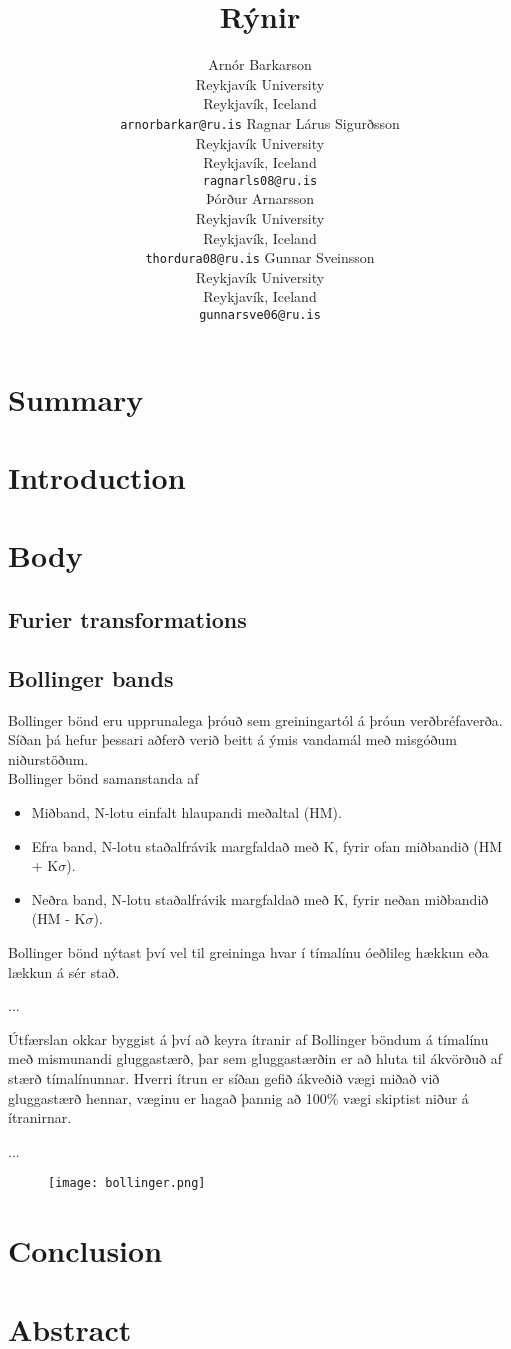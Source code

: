 \documentclass[11pt]{article}
\title{Rýnir}
\author{Arnór Barkarson\\
  Reykjavík University\\
  Reykjavík, Iceland\\
  {\tt arnorbarkar@ru.is}  \And  
  Ragnar Lárus Sigurðsson\\
  Reykjavík University\\
  Reykjavík, Iceland\\
  {\tt  ragnarls08@ru.is}\\ \And 
  Þórður Arnarsson\\
  Reykjavík University\\
  Reykjavík, Iceland\\
  {\tt  thordura08@ru.is}  \And 
  Gunnar Sveinsson\\
  Reykjavík University\\
  Reykjavík, Iceland\\
  {\tt  gunnarsve06@ru.is} 
}
\date{}
\begin{document}
\maketitle


\section{Summary}
\section{Introduction}
\section{Body}
\subsection{Furier transformations}

\subsection{Bollinger bands}
\label{sec:third}

Bollinger bönd eru upprunalega þróuð sem greiningartól á þróun verðbréfaverða. Síðan þá hefur þessari aðferð verið beitt á ýmis
vandamál með misgóðum niðurstöðum. \\

Bollinger bönd samanstanda af
\begin{itemize}
  \item Miðband, N-lotu einfalt hlaupandi meðaltal (HM).
  \item Efra band, N-lotu staðalfrávik margfaldað með K, fyrir ofan miðbandið (HM + K$\sigma$).
  \item Neðra band, N-lotu staðalfrávik margfaldað með K, fyrir neðan miðbandið (HM - K$\sigma$).
\end{itemize}

Bollinger bönd nýtast því vel til greininga hvar í tímalínu óeðlileg hækkun eða lækkun á sér stað.



...

Útfærslan okkar byggist á því að keyra ítranir af Bollinger böndum á tímalínu með mismunandi gluggastærð, þar sem gluggastærðin er að hluta til ákvörðuð
af stærð tímalínunnar. Hverri ítrun er síðan gefið ákveðið vægi miðað við gluggastærð hennar, væginu er hagað þannig að 100\% vægi skiptist niður á ítranirnar.

...

\begin{figure}
  \texttt{[image: bollinger.png]}
\end{figure}




\section{Conclusion}
\section{Abstract}

 
\end{document}
